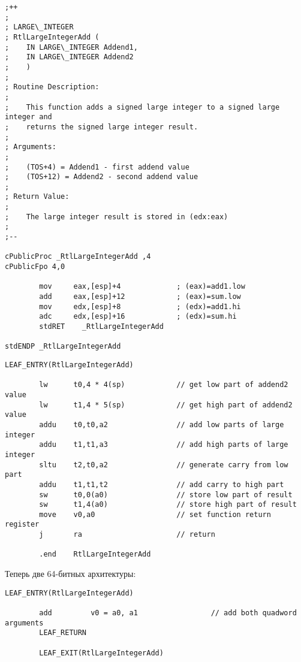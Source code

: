 \begin{lstlisting}[style=customasmx86,caption=Архитектура i386]
;++
;
; LARGE\_INTEGER
; RtlLargeIntegerAdd (
;    IN LARGE\_INTEGER Addend1,
;    IN LARGE\_INTEGER Addend2
;    )
;
; Routine Description:
;
;    This function adds a signed large integer to a signed large integer and
;    returns the signed large integer result.
;
; Arguments:
;
;    (TOS+4) = Addend1 - first addend value
;    (TOS+12) = Addend2 - second addend value
;
; Return Value:
;
;    The large integer result is stored in (edx:eax)
;
;--

cPublicProc _RtlLargeIntegerAdd ,4
cPublicFpo 4,0

        mov     eax,[esp]+4             ; (eax)=add1.low
        add     eax,[esp]+12            ; (eax)=sum.low
        mov     edx,[esp]+8             ; (edx)=add1.hi
        adc     edx,[esp]+16            ; (edx)=sum.hi
        stdRET    _RtlLargeIntegerAdd

stdENDP _RtlLargeIntegerAdd
\end{lstlisting}

\begin{lstlisting}[caption=Архитектура MIPS]
        LEAF_ENTRY(RtlLargeIntegerAdd)

        lw      t0,4 * 4(sp)            // get low part of addend2 value
        lw      t1,4 * 5(sp)            // get high part of addend2 value
        addu    t0,t0,a2                // add low parts of large integer
        addu    t1,t1,a3                // add high parts of large integer
        sltu    t2,t0,a2                // generate carry from low part
        addu    t1,t1,t2                // add carry to high part
        sw      t0,0(a0)                // store low part of result
        sw      t1,4(a0)                // store high part of result
        move    v0,a0                   // set function return register
        j       ra                      // return

        .end    RtlLargeIntegerAdd
\end{lstlisting}

Теперь две 64-битных архитектуры:

\begin{lstlisting}[caption=Архитектура Itanium]
        LEAF_ENTRY(RtlLargeIntegerAdd)

        add         v0 = a0, a1                 // add both quadword arguments
        LEAF_RETURN

        LEAF_EXIT(RtlLargeIntegerAdd)
\end{lstlisting}

